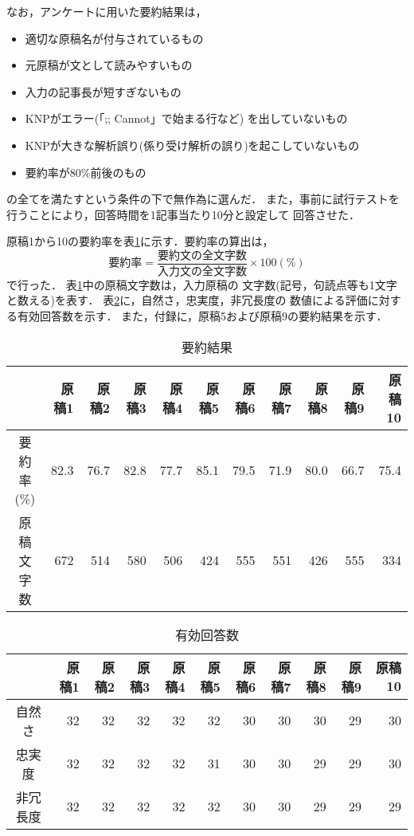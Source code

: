 なお，アンケートに用いた要約結果は，
\begin{itemize} 
       \item 適切な原稿名が付与されているもの
       \item 元原稿が文として読みやすいもの
       \item 入力の記事長が短すぎないもの
       \item KNPがエラー(「;; Cannot」で始まる行など)
	     を出していないもの
\label{part:004}
       \item KNPが大きな解析誤り(係り受け解析の誤り)を起こしていないもの
       \item 要約率が80\%前後のもの
\end{itemize}
の全てを満たすという条件の下で無作為に選んだ．
また，事前に試行テストを行うことにより，回答時間を1記事当たり10分と設定して
回答させた．

原稿1から10の要約率を表\ref{table:youyakukekka}に示す．要約率の算出は，
       \[
       要約率 = \frac{要約文の全文字数}{入力文の全文字数}
                \times 100 (\%)
       \]
で行った．
表\ref{table:youyakukekka}中の原稿文字数は，入力原稿の
文字数(記号，句読点等も1文字と数える)を表す．
表\ref{table:yukokaitousu}に，自然さ，忠実度，非冗長度の
数値による評価に対する有効回答数を示す．
また，付録に，原稿5および原稿9の要約結果を示す．
\begin{table}[tbp]
 
 \scriptsize
 \begin{center}
  \caption{要約結果}
  \label{table:youyakukekka}
  \begin{tabular}{|c||r|r|r|r|r|r|r|r|r|r|}\hline
    & 原稿1 & 原稿2 & 原稿3 & 原稿4 & 原稿5 &
  原稿6 & 原稿7 & 原稿8 & 原稿9 & 原稿10 \\ \hline
   \hline
   要約率(\%) &
   82.3 & 76.7 & 82.8 & 77.7 & 85.1 &
   79.5 & 71.9 & 80.0 & 66.7 & 75.4 \\
   \hline
   原稿文字数 &
   672 & 514 & 580 & 506 & 424 & 555 & 551 & 426 & 555 & 334 \\
   \hline
  \end{tabular}
 \end{center}
\end{table}

\begin{table}[tbp]
 
 \scriptsize
 \begin{center}
  \caption{有効回答数}
  \label{table:yukokaitousu}
  \begin{tabular}{|c||r|r|r|r|r|r|r|r|r|r|}\hline
    & 原稿1 & 原稿2 & 原稿3 & 原稿4 & 原稿5 &
  原稿6 & 原稿7 & 原稿8 & 原稿9 & 原稿10 \\ \hline
   \hline
   自然さ & 
   32 & 32 & 32 & 32 & 32 & 30 & 30 & 30 & 29 & 30 \\
   忠実度 &
   32 & 32 & 32 & 32 & 31 & 30 & 30 & 29 & 29 & 30 \\
   非冗長度 &
   32 & 32 & 32 & 32 & 32 & 30 & 30 & 29 & 29 & 29 \\
   \hline
  \end{tabular}
 \end{center}
\end{table}


